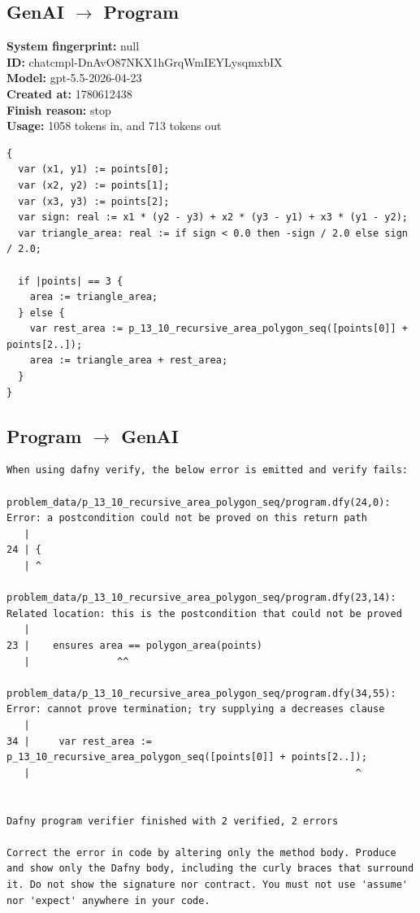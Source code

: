 \documentclass{article}
\begin{document}
\subsection*{GenAI $\rightarrow$ Program}
\textbf{System fingerprint: }null
\\\textbf{ID: }chatcmpl-DnAvO87NKX1hGrqWmIEYLysqmxbIX
\\\textbf{Model: }gpt-5.5-2026-04-23
\\\textbf{Created at: }1780612438
\\\textbf{Finish reason: }stop
\\\textbf{Usage: }1058 tokens in, and 713 tokens out
\begin{lstlisting}
{
  var (x1, y1) := points[0];
  var (x2, y2) := points[1];
  var (x3, y3) := points[2];
  var sign: real := x1 * (y2 - y3) + x2 * (y3 - y1) + x3 * (y1 - y2);
  var triangle_area: real := if sign < 0.0 then -sign / 2.0 else sign / 2.0;

  if |points| == 3 {
    area := triangle_area;
  } else {
    var rest_area := p_13_10_recursive_area_polygon_seq([points[0]] + points[2..]);
    area := triangle_area + rest_area;
  }
}
\end{lstlisting}
\subsection*{Program $\rightarrow$ GenAI}
\begin{lstlisting}
When using dafny verify, the below error is emitted and verify fails:

problem_data/p_13_10_recursive_area_polygon_seq/program.dfy(24,0): Error: a postcondition could not be proved on this return path
   |
24 | {
   | ^

problem_data/p_13_10_recursive_area_polygon_seq/program.dfy(23,14): Related location: this is the postcondition that could not be proved
   |
23 | 	ensures area == polygon_area(points)
   |               ^^

problem_data/p_13_10_recursive_area_polygon_seq/program.dfy(34,55): Error: cannot prove termination; try supplying a decreases clause
   |
34 |     var rest_area := p_13_10_recursive_area_polygon_seq([points[0]] + points[2..]);
   |                                                        ^


Dafny program verifier finished with 2 verified, 2 errors

Correct the error in code by altering only the method body. Produce and show only the Dafny body, including the curly braces that surround it. Do not show the signature nor contract. You must not use 'assume' nor 'expect' anywhere in your code.
\end{lstlisting}
\end{document}

